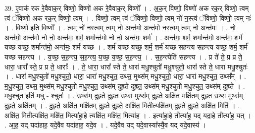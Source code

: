 \documentclass[17pt]{extarticle}
\begin{document}
39. ए॒वाक॑ रक रे॒वैवाक॒र् विष्णो॒ विष्णो॑ अक रे॒वैवाक॒र् विष्णो᳚ । . अ॒क॒र् विष्णो॒ विष्णो॑ अक रक॒र् विष्णो॒ त्वम् त्वं ॅविष्णो॑ अक रक॒र् विष्णो॒ त्वम् । . विष्णो॒ त्वम् त्वं ॅविष्णो॒ विष्णो॒ त्वम् नो॑ न॒स्त्वं ॅविष्णो॒ विष्णो॒ त्वम् नः॑ । . विष्णो॒ इति॒ विष्णो᳚ । . त्वम् नो॑ न॒स्त्वम् त्वम् नो॒ अन्त॑मो॒ अन्त॑मो न॒स्त्वम् त्वम् नो॒ अन्त॑मः । . नो॒ अन्त॑मो॒ अन्त॑मो नो नो॒ अन्त॑मः॒ शर्म॒ शर्मान्त॑मो नो नो॒ अन्त॑मः॒ शर्म॑ । . अन्त॑मः॒ शर्म॒ शर्मान्त॑मो॒ अन्त॑मः॒ शर्म॑ यच्छ यच्छ॒ शर्मान्त॑मो॒ अन्त॑मः॒ शर्म॑ यच्छ । . शर्म॑ यच्छ यच्छ॒ शर्म॒ शर्म॑ यच्छ सहन्त्य सहन्त्य यच्छ॒ शर्म॒ शर्म॑ यच्छ सहन्त्य । . य॒च्छ॒ स॒ह॒न्त्य॒ स॒ह॒न्त्य॒ य॒च्छ॒ य॒च्छ॒ स॒ह॒न्त्य॒ । . स॒ह॒न्त्येति॑ सहन्त्य । . प्र ते॑ ते॒ प्र प्र ते॒ धारा॒ धारा᳚ स्ते॒ प्र प्र ते॒ धाराः᳚ । . ते॒ धारा॒ धारा᳚ स्ते ते॒ धारा॑ मधु॒श्चुतो॑ मधु॒श्चुतो॒ धारा᳚ स्ते ते॒ धारा॑ मधु॒श्चुतः॑ । . धारा॑ मधु॒श्चुतो॑ मधु॒श्चुतो॒ धारा॒ धारा॑ मधु॒श्चुत॒ उथ्स॒ मुथ्स॑म् मधु॒श्चुतो॒ धारा॒ धारा॑ मधु॒श्चुत॒ उथ्स᳚म् । . म॒धु॒श्चुत॒ उथ्स॒ मुथ्स॑म् मधु॒श्चुतो॑ मधु॒श्चुत॒ उथ्स॑म् दुह्रते दुह्रत॒ उथ्स॑म् मधु॒श्चुतो॑ मधु॒श्चुत॒ उथ्स॑म् दुह्रते । . म॒धु॒श्चुत॒ इति॑ मधु - श्चुतः॑ । . उथ्स॑म् दुह्रते दुह्रत॒ उथ्स॒ मुथ्स॑म् दुह्रते॒ अक्षि॑त॒ मक्षि॑तम् दुह्रत॒ उथ्स॒ मुथ्स॑म् दुह्रते॒ अक्षि॑तम् । . दु॒ह्र॒ते॒ अक्षि॑त॒ मक्षि॑तम् दुह्रते दुह्रते॒ अक्षि॑त॒ मितीत्यक्षि॑तम् दुह्रते दुह्रते॒ अक्षि॑त॒ मिति॑ । . अक्षि॑त॒ मितीत्यक्षि॑त॒ मक्षि॑त॒ मित्या॑हा॒हे त्यक्षि॑त॒ मक्षि॑त॒ मित्या॑ह । . इत्या॑हा॒हे तीत्या॑ह॒ यद् यदा॒हे तीत्या॑ह॒ यत् । . आ॒ह॒ यद् यदा॑हाह॒ यदे॒वैव यदा॑हाह॒ यदे॒व । . यदे॒वैव यद् यदे॒वास्या᳚स्यै॒व यद् यदे॒वास्य॑ । \newline
\end{document}
